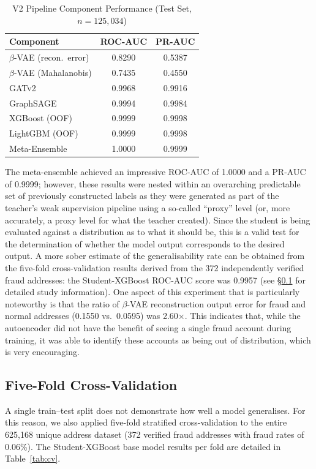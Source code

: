 \documentclass[journal]{IEEEtran}
\begin{document}
\begin{table}[!t]
\centering
\caption{V2 Pipeline Component Performance (Test Set, $n = 125{,}034$)}
\label{tab:v2perf}
\begin{tabular}{lcc}
\toprule
\textbf{Component} & \textbf{ROC-AUC} & \textbf{PR-AUC} \\
\midrule
$\beta$-VAE (recon.\ error) & 0.8290 & 0.5387 \\
$\beta$-VAE (Mahalanobis) & 0.7435 & 0.4550 \\
GATv2 & 0.9968 & 0.9916 \\
GraphSAGE & 0.9994 & 0.9984 \\
XGBoost (OOF) & 0.9999 & 0.9998 \\
LightGBM (OOF) & 0.9999 & 0.9998 \\
Meta-Ensemble & 1.0000 & 0.9999 \\
\bottomrule
\end{tabular}
\end{table}

The meta-ensemble achieved an impressive ROC-AUC of 1.0000 and a PR-AUC of 0.9999; however, these results were nested within an overarching predictable set of previously constructed labels as they were generated as part of the teacher's weak supervision pipeline using a so-called ``proxy'' level (or, more accurately, a proxy level for what the teacher created). Since the student is being evaluated against a distribution as to what it should be, this is a valid test for the determination of whether the model output corresponds to the desired output. A more sober estimate of the generalisability rate can be obtained from the five-fold cross-validation results derived from the 372 independently verified fraud addresses: the Student-XGBoost ROC-AUC score was 0.9957 (see \S\ref{sec:crossval} for detailed study information). One aspect of this experiment that is particularly noteworthy is that the ratio of $\beta$-VAE reconstruction output error for fraud and normal addresses (0.1550 vs.\ 0.0595) was 2.60$\times$. This indicates that, while the autoencoder did not have the benefit of seeing a single fraud account during training, it was able to identify these accounts as being out of distribution, which is very encouraging.

\subsection{Five-Fold Cross-Validation}
\label{sec:crossval}

A single train--test split does not demonstrate how well a model generalises. For this reason, we also applied five-fold stratified cross-validation to the entire 625,168 unique address dataset (372 verified fraud addresses with fraud rates of 0.06\%). The Student-XGBoost base model results per fold are detailed in Table~\ref{tab:cv}.
\end{document}
